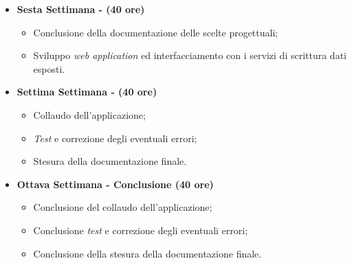 \begin{itemize}
\begin{itemize}
    \end{itemize}
    \item \textbf{Sesta Settimana - (40 ore)} 
    \begin{itemize}
        \item Conclusione della documentazione delle scelte progettuali;
        \item Sviluppo \textit{web application} ed interfacciamento con i servizi di scrittura dati esposti.
    \end{itemize}
    \item \textbf{Settima Settimana - (40 ore)} 
    \begin{itemize}
        \item Collaudo dell'applicazione;
        \item \textit{Test} e correzione degli eventuali errori;
        \item Stesura della documentazione finale.
    \end{itemize}
    \item \textbf{Ottava Settimana - Conclusione (40 ore)} 
    \begin{itemize}
        \item Conclusione del collaudo dell'applicazione;
        \item Conclusione \textit{test} e correzione degli eventuali errori;
        \item Conclusione della stesura della documentazione finale.
    \end{itemize}
\end{itemize}

